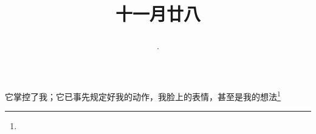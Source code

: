 \title{\date[d=28,m=12,y=2024][year:cn-y,年,month:cn,day:cn,日,·,weekday]·十一月廿八 }
它掌控了我；它已事先规定好我的动作，我脸上的表情，甚至是我的想法\footnote{ }

